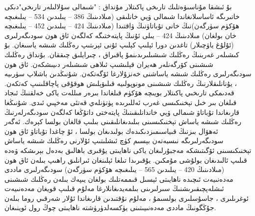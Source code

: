 \documentclass[a4paper]{article}
\begin{document}
\begin{flushright}
بۇ ئىشقا مۇناسىۋەتلىك تارىخى پاكىتلار مۇنداق : "شىمالى سۇلالىلەر تارىخى"دىكى خاتىرىگە ئاساسلانغاندا شىمالى ۋېي خانلىقى (مىلادىنىڭ 386 – يىلىدىن 534 – يىلىغىچە ھۆكۈم سۈرگەن)نىڭ خانى تۇباتاۋنىڭ ۋاقتىدا (مىلادىنىڭ 424 – يىلىدىن 452 – يىلىغىچە خان بولغان) مىلادىنىڭ 424 – يىلى ئۇنىڭ پايتەختىگە كەلگەن ئاق ھون سودىگەرلىرى (ئۇلۇغ ياۋچىلار) تاغدىن دورا ئېلىپ كېلىپ ئۇنى ئېرىتىپ رەڭلىك شىشە ياسىغان. بۇ كىشىلەر غەربنىڭ رەڭلىك شىشىلىرىدىنمۇ پاقىراق ، چىرايلىق چىققان. بۇنداق رەڭلىك شىشىنى كۆرگەنلەر ھەيران قېلىشىپ ئىلاھى شىشىلەر دىيىشكەن. ئاق ھون سودىگەرلىرى رەڭلىك شىشە ياساشنى خەنزۇلارغا ئۆگەتكەن. شۇنىڭدىن باشلاپ سۈرىيە ، يۇنانلىقلارنىڭ رەڭلىك شىشىنى مونوپولىيە قىلىۋېلىش ھوقۇقى پاچاقلىنىپ كەتكەن. قەدىمكى تارىخىي پاكىتلار بويىچە ھۆكۈم قىلغاندا بىرەر مىللەت ياكى خەلقنىڭ ئىجاد قىلغان بىر خىل تېخنىكىسى غەرب ئەللىرىدە پۈتۈنلەي قەتئى مەخپىي ئىدى. شۇنىڭغا قارىغاندا تۇباتاۋ شىمالى ۋېي خاندانلىقىنىڭ پايتەختى داتۇڭغا كەلگەن سودىگەرلەرنىڭ رەڭلىك شىشە ياساش تېخنىكىسىنى بىلىدىغانلىقىنى بىلىپ قالغان بولسا كېرەك. ئەگەر ئەھۋال بىزنىڭ قىياسىمىزدىكىدەك بولىدىغان بولسا ، ئۇ چاغدا تۇباتاۋ ئاق ھون سودىگەرلىرىگە نىسبەتەن بېسىم كۈچ ئىشلىتىپ ئۇلارنى رەڭلىك شىشە ياساش تېخنىكىسىنى ئۆگىتىشكە مەجبۇرلىغان ياكى ناھايىتى يۇقىرى باھالىق بەدەل بېرىشكە ۋەدە قىلىپ ئالىدىغان بولۇشى مۇمكىن. يۇقىرىدا تىلغا ئېلىنغان ئىرانلىق راھىپ بىلەن ئاق ھون (مىلادىنىڭ 420 – يىلىدىن 565 – يىلىغىچە ھۆكۈم سۈرگەن) سودىگەرلىرى ماددى مەدەنىيەت ئىچىدە ناھايىتى ئېسىل قىممەتلىك بولغان يىپەك بىلەن رەڭلىك شىشىنى ئىشلەپچىقىرىشنىڭ سىرلىرىنى بىلمەيدىغانلارغا مەلۇم قىلىپ قويغان مەدەنىيەت ئوغرىلىرى ، جاسۇسلىرى بولسىمۇ ، مەلۇم نۇقتىدىن قارىغاندا ئۇلار شەرقىي روما بىلەن جۇڭگونىڭ ماددى مەدەنىيىتىنى يۈكسەلدۈرۈشتە ناھايىتى چوڭ رول ئوينىغان.




\end{flushright}
\end{document}
